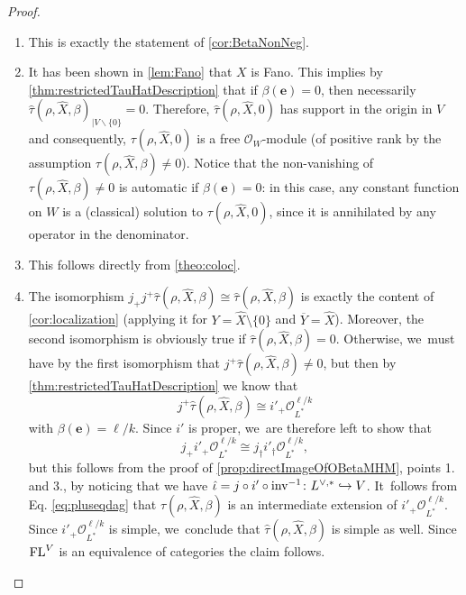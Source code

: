 \documentclass[JEP,XML,SOM,Unicode,published]{cedram}
\newcommand\hto{\mathrel{\lhook\joinrel\to}}
\newcommand{\bme}{{\boldsymbol{e}}}
\newcommand{\cO}{\mathcal{O}}\let\O\cO
\DeclareMathOperator{\FL}{\textup{FL}}
\begin{document}
\skpt
\begin{proof}
\begin{enumerate}
\item
This is exactly the statement of \cref{cor:BetaNonNeg}.

\item
It has been shown in \cref{lem:Fano} that $X$ is Fano. This implies by \cref{thm:restrictedTauHatDescription} that if $\beta(\bme)=0$, then necessarily $\hat{\tau}(\rho,\hat{X},\beta)_{|V\backslash\{0\}}=0$. Therefore, $\hat{\tau}(\rho,\hat{X},0)$ has support in the origin in $V$ and consequently, $\tau(\rho,\hat{X},0)$ is a free $\cO_W$\nobreakdash-mod\-ule (of positive rank by the assumption $\tau(\rho,\hat{X},\beta)\!\neq\! 0$). Notice that the non-vanishing of \hbox{$\tau(\rho,\hat{X},\beta)\!\neq\! 0$} is automatic if $\beta(\bme)=0$: in this case, any constant function on $W$ is a (classical) solution to $\tau(\rho,\hat{X},0)$, since it is annihilated by any operator in the denominator.
\item
This follows directly from \cref{theo:coloc}.
\item
The isomorphism
$j_+ j^+ \hat{\tau}(\rho, \hat{X}, \beta) \cong \hat{\tau}(\rho, \hat{X}, \beta)$ is exactly the content of \cref{cor:localization} (applying it for $Y=\hat{X}\setminus \{0\}$ and $\overline{Y}=\hat{X}$). Moreover, the second isomorphism is obviously true if $\hat{\tau}(\rho, \hat{X}, \beta)=0$. Otherwise, we~must have by the first isomorphism that
$j^+\hat{\tau}(\rho, \hat{X}, \beta)\neq 0$, but then by
\cref{thm:restrictedTauHatDescription} we know that
\[
j^+\hat{\tau}(\rho, \hat{X}, \beta) \cong
i'_+ \O_{L^*}^{\ell/k}
\]
with $\beta(\bme)=\ell/k$. Since $i'$ is proper, we~are therefore left to show that
\begin{equation}\label{eq:pluseqdag}
j_+ i'_+ \O_{L^*}^{\ell/k} \cong j_\dag i'_\dag \O_{L^*}^{\ell/k},
\end{equation}
but this follows from the proof of \cref{prop:directImageOfOBetaMHM}, points 1. and 3., by noticing that we have $\hat{\iota}=j\circ i' \circ \textup{inv}^{-1} \colon L^{\vee,*}\hto V$. It~follows from Eq. \eqref{eq:pluseqdag} that $\hat{\tau}(\rho, \hat{X}, \beta)$ is an intermediate extension of $i'_+ \O_{L^*}^{\ell/k}$. Since $ i'_+ \O_{L^*}^{\ell/k}$ is simple, we~conclude that $\hat{\tau}(\rho, \hat{X}, \beta)$ is simple as well. Since $\FL^V$ is an equivalence of categories the claim follows.\qedhere
\end{enumerate}
\end{proof}
\end{document}
